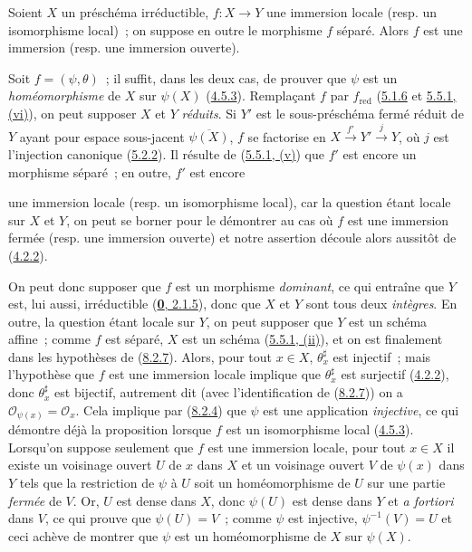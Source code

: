 \begin{proposition}[8.2.8]
\label{I.8.2.8-fr}
Soient $X$ un préschéma \textup{irréductible}, $f:X\to Y$ une immersion locale
\textup{(resp.} un isomorphisme local)~; on suppose en outre le morphisme $f$ séparé.
Alors $f$ est une immersion \textup{(resp.} une immersion ouverte).
\end{proposition}

Soit $f=(\psi,\theta)$~; il suffit, dans les deux cas, de prouver que $\psi$
est un \emph{homéomorphisme} de $X$ sur $\psi(X)$
(\hyperref[I.4.5.3-fr]{4.5.3}). Remplaçant $f$ par $f_{\mathrm{red}}$
(\hyperref[I.5.1.6-fr]{5.1.6} et
\hyperref[I.5.5.1-fr]{5.5.1, (vi)}), on peut supposer $X$ et $Y$ \emph{réduits}. Si
$Y'$ est le sous-préschéma fermé réduit de $Y$ ayant pour espace sous-jacent
$\overline{\psi(X)}$, $f$ se factorise en
$X\xrightarrow{f'}Y'\xrightarrow{j}Y$, où $j$ est l'injection canonique
(\hyperref[I.5.2.2-fr]{5.2.2}). Il résulte de
(\hyperref[I.5.5.1-fr]{5.5.1, (v)}) que $f'$ est encore un morphisme séparé~;
en outre, $f'$ est encore

une immersion locale (resp. un isomorphisme local), car la question étant
locale sur $X$ et $Y$, on peut se borner pour le démontrer au cas où $f$ est
une immersion fermée (resp. une immersion ouverte) et notre assertion découle
alors aussitôt de (\hyperref[I.4.2.2-fr]{4.2.2}).

On peut donc supposer que $f$ est un morphisme \emph{dominant}, ce qui
entraîne que $Y$ est, lui aussi, irréductible
(\hyperref[0.2.1.5-fr]{\textbf{0}, 2.1.5}), donc que $X$ et $Y$ sont tous deux
\emph{intègres}. En outre, la question étant locale sur $Y$, on peut supposer
que $Y$ est un schéma affine~; comme $f$ est séparé, $X$ est un schéma
(\hyperref[I.5.5.1-fr]{5.5.1, (ii)}), et on est finalement dans les
hypothèses de (\hyperref[I.8.2.7-fr]{8.2.7}). Alors, pour tout $x\in X$,
$\theta_x^\sharp$ est injectif~; mais l'hypothèse que $f$ est une immersion
locale implique que $\theta_x^\sharp$ est surjectif
(\hyperref[I.4.2.2-fr]{4.2.2}), donc $\theta_x^\sharp$ est bijectif,
autrement dit (avec l'identification de
(\hyperref[I.8.2.7-fr]{8.2.7})) on a
$\mathscr{O}_{\psi(x)}=\mathscr{O}_x$. Cela implique par
(\hyperref[I.8.2.4-fr]{8.2.4}) que $\psi$ est une application
\emph{injective}, ce qui démontre déjà la proposition lorsque $f$ est un
isomorphisme local (\hyperref[I.4.5.3-fr]{4.5.3}). Lorsqu'on suppose seulement
que $f$ est une immersion locale, pour tout $x\in X$ il existe un voisinage
ouvert $U$ de $x$ dans $X$ et un voisinage ouvert $V$ de $\psi(x)$ dans $Y$
tels que la restriction de $\psi$ à $U$ soit un homéomorphisme de $U$ sur une
partie \emph{fermée} de $V$. Or, $U$ est dense dans $X$, donc $\psi(U)$ est
dense dans $Y$ et \emph{a fortiori} dans $V$, ce qui prouve que
$\psi(U)=V$~; comme $\psi$ est injective, $\psi^{-1}(V)=U$ et ceci achève de
montrer que $\psi$ est un homéomorphisme de $X$ sur $\psi(X)$.

